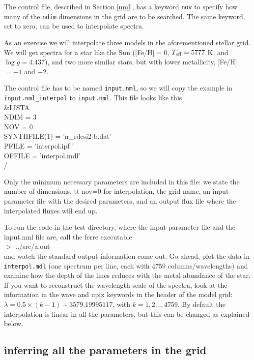 \documentclass[12pt]{article}
\begin{document}
The control file, described in Section \ref{nml}, has a keyword 
{\tt nov} to specify how many of the {\tt ndim} dimensions in the grid are to be 
searched. The same keyword, set to zero, can be used to interpolate spectra.

As an exercise we will interpolate three models in the aforementioned stellar grid. 
We will get spectra for a star like the Sun ([Fe/H]$=0$, $T_{\rm eff}=5777$ K,  
and $\log g=4.437$), and two more similar stars, but with lower metallicity, [Fe/H]$=-1$ and $-2$. 

The control file has to be named {\tt input.nml}, so we will copy the example
in \\
{\tt input.nml\_interpol} to {\tt input.nml}. This file looks like this \\
 \&LISTA \\
 NDIM = 3 \\
 NOV = 0 \\
 SYNTHFILE(1) = 'n\_rdesi2-b.dat' \\
 PFILE = 'interpol.ipf ' \\
 OFFILE = 'interpol.mdl' \\
 \// 


Only the minimum necessary parameters are included in this file: we state the 
number of dimensions, {tt nov=0} for interpolation, the grid name, an input 
parameter file with the desired parameters, and an output flux file where the 
interpolated fluxes will end up. 

To run the code in the test directory, where the input parameter file and the 
input.nml file are, call the ferre executable \\
$>$ ../src/a.out \\
and watch the standard output information come out. Go ahead, plot the data 
in {\tt interpol.mdl} (one spectrum per line, each with 4759 columns/wavelengths) 
and examine how the depth of the lines reduces with the metal abundance of the star. 
If you want to reconstruct the wavelength scale of the spectra, look at the 
information in the {\sc wave} and {\sc npix} keywords in the header of the model 
grid: $\lambda = 0.5 \times (k-1) + 3579.19995117$, with $k=1,2...,4759$. By default the interpolation is linear in all the parameters, but this can be changed as explained below.



\subsection{inferring all the parameters in the grid}
\end{document}
